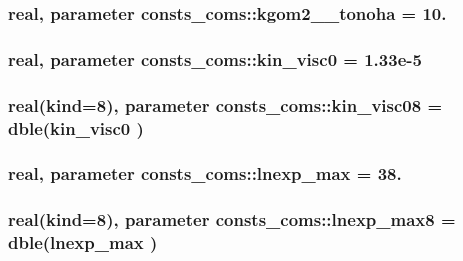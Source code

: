 \subsubsection[{\texorpdfstring{kgom2\+\_\+2\+\_\+tonoha}{kgom2_2_tonoha}}]{\setlength{\rightskip}{0pt plus 5cm}real, parameter consts\+\_\+coms\+::kgom2\+\_\+\_\+tonoha = 10.}\hypertarget{namespaceconsts__coms_a2061fb811f5d7c9f856e62b48d85c10c}{}\label{namespaceconsts__coms_a2061fb811f5d7c9f856e62b48d85c10c}
\subsubsection[{\texorpdfstring{kin\+\_\+visc0}{kin_visc0}}]{\setlength{\rightskip}{0pt plus 5cm}real, parameter consts\+\_\+coms\+::kin\+\_\+visc0 = 1.\+33e-\/5}\hypertarget{namespaceconsts__coms_acff2483efb6558e2a08c463ffc2fe19d}{}\label{namespaceconsts__coms_acff2483efb6558e2a08c463ffc2fe19d}
\subsubsection[{\texorpdfstring{kin\+\_\+visc08}{kin_visc08}}]{\setlength{\rightskip}{0pt plus 5cm}real(kind=8), parameter consts\+\_\+coms\+::kin\+\_\+visc08 = dble({\bf kin\+\_\+visc0} )}\hypertarget{namespaceconsts__coms_a412fde0c874abb8d51db37875fd0207d}{}\label{namespaceconsts__coms_a412fde0c874abb8d51db37875fd0207d}
\subsubsection[{\texorpdfstring{lnexp\+\_\+max}{lnexp_max}}]{\setlength{\rightskip}{0pt plus 5cm}real, parameter consts\+\_\+coms\+::lnexp\+\_\+max = 38.}\hypertarget{namespaceconsts__coms_aeb257212c54fabf595d8fb81170ef1d8}{}\label{namespaceconsts__coms_aeb257212c54fabf595d8fb81170ef1d8}
\subsubsection[{\texorpdfstring{lnexp\+\_\+max8}{lnexp_max8}}]{\setlength{\rightskip}{0pt plus 5cm}real(kind=8), parameter consts\+\_\+coms\+::lnexp\+\_\+max8 = dble({\bf lnexp\+\_\+max} )}\hypertarget{namespaceconsts__coms_af97aceda250c3242870c60e2e5ad8f4c}{}\label{namespaceconsts__coms_af97aceda250c3242870c60e2e5ad8f4c}

